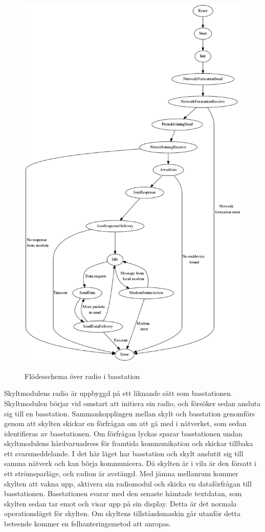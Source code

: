 \documentclass[a4paper,11pt]{article}
\begin{document}
\begin{figure}[H]
\includegraphics[scale=0.3, angle=0]{basFSM.png}
\label{fig:radio_bas}
\caption{Flödesschema över radio i basstation}
\end{figure}

Skyltmodulens radio är uppbyggd på ett liknande sätt som basstationen. Skyltmodulen börjar vid omstart att initiera sin radio, och försöker sedan ansluta sig till en basstation. Sammankopplingen mellan skylt och basstation genomförs genom att skylten skickar en förfrågan om att gå med i nätverket, som sedan identifieras av basstationen. Om förfrågan lyckas sparar basstationen undan skyltmodulens hårdvaruadress för framtida kommunikation och skickar tillbaka ett svarsmeddelande. I det här läget har basstation och skylt anslutit sig till samma nätverk och kan börja kommunicera. Då skylten är i vila är den försatt i ett strömsparläge, och radion är avstängd. Med jämna mellanrum kommer skylten att vakna upp, aktivera sin radiomodul och skicka en dataförfrågan till basstationen. Basstationen svarar med den senaste hämtade textdatan, som skylten sedan tar emot och visar upp på sin display. Detta är det normala operationsläget för skylten. Om skyltens tillståndsmaskin går utanför detta beteende kommer en felhanteringsmetod att anropas.
\end{document}
